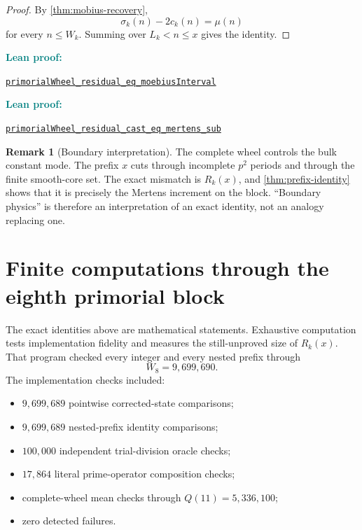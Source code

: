 \documentclass[11pt]{article}
\theoremstyle{definition}
\newtheorem{remark}[theorem]{Remark}
\newcommand{\leanxref}[3]{%
  \par\smallskip
  {\small\noindent\textcolor{teal}{\textbf{#1:}}\par
  \noindent\href{#3}{\nolinkurl{#2}}\par}
  \smallskip
}
\begin{document}
\begin{proof}
By \cref{thm:mobius-recovery},
\[
\sigma_k(n)-2c_k(n)=\mu(n)
\]
for every $n\le W_k$.  Summing over $L_k<n\le x$ gives the identity.
\end{proof}
\leanxref{Lean proof}{primorialWheel_residual_eq_moebiusInterval}{https://github.com/OVVO-Financial/prime-wheel-mobius/blob/main/formalization/RHLean/Arithmetic/PrimorialWheelPrefixIdentity.lean}
\leanxref{Lean proof}{primorialWheel_residual_cast_eq_mertens_sub}{https://github.com/OVVO-Financial/prime-wheel-mobius/blob/main/formalization/RHLean/Arithmetic/PrimorialWheelPrefixIdentity.lean}

\begin{remark}[Boundary interpretation]
The complete wheel controls the bulk constant mode.  The prefix $x$ cuts through incomplete $p^2$ periods and through the finite smooth-core set.  The exact mismatch is $R_k(x)$, and \cref{thm:prefix-identity} shows that it is precisely the Mertens increment on the block.  ``Boundary physics'' is therefore an interpretation of an exact identity, not an analogy replacing one.
\end{remark}

\section{Finite computations through the eighth primorial block}

The exact identities above are mathematical statements.  Exhaustive computation tests implementation fidelity and measures the still-unproved size of $R_k(x)$.\\




That program checked every integer and every nested prefix through
\[
W_8=9{,}699{,}690.
\]
The implementation checks included:
\begin{itemize}
\item $9{,}699{,}689$ pointwise corrected-state comparisons;
\item $9{,}699{,}689$ nested-prefix identity comparisons;
\item $100{,}000$ independent trial-division oracle checks;
\item $17{,}864$ literal prime-operator composition checks;
\item complete-wheel mean checks through $Q(11)=5{,}336{,}100$;
\item zero detected failures.
\end{itemize}
\end{document}
